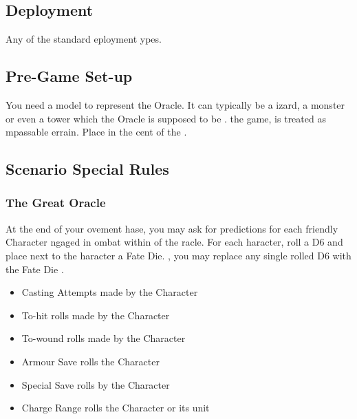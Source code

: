 
\label{AnEyeintheFuture}


\subsection*{Deployment}

Any of the standard eployment ypes.

\subsection*{Pre-Game Set-up}

You need a model to represent the Oracle. It can typically be a izard, a monster\rewordedrule{,} or even a tower which the Oracle is supposed to be .  the game,  is treated as mpassable errain. Place  in the cent of the .

\subsection*{Scenario Special Rules}

\subsubsection*{The Great Oracle}

At the end of your ovement hase, you may ask  for predictions for each friendly Character  ngaged in ombat within  of the racle. For each haracter, roll a D6 and place  next to the haracter a Fate Die. , you may replace any single rolled D6 with the Fate Die .

\begin{itemize}
\item Casting Attempts made by the Character
\item To-hit rolls  made by the Character
\item To-wound rolls  made by the Character
\item Armour Save rolls  the Character
\item Special Save rolls  by the Character
\item Charge Range rolls  the Character or its unit
\end{itemize}

